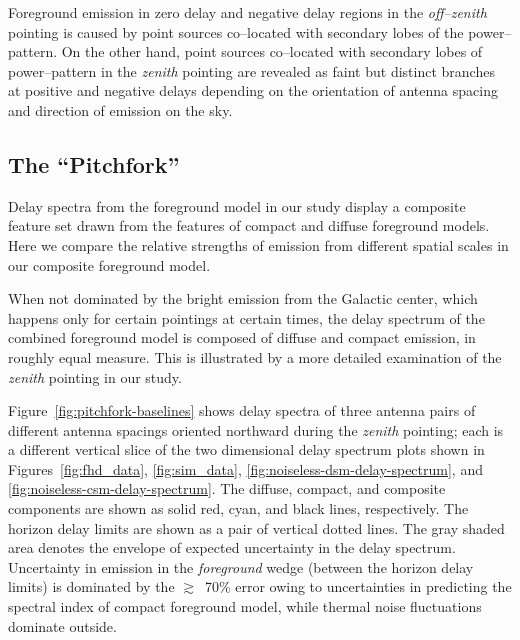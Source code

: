 \documentclass[preprint2,iop,numberedappendix]{emulateapj}
\begin{document}
Foreground emission in zero delay and negative delay regions in the {\it off--zenith} pointing is caused by point sources co--located with secondary lobes of the power--pattern. On the other hand, point sources co--located with secondary lobes of power--pattern in the {\it zenith} pointing are revealed as faint but distinct branches at positive and negative delays depending on the orientation of antenna spacing and direction of emission on the sky. 

\subsection{The ``Pitchfork''}\label{sec:composite}

Delay spectra from the foreground model in our study display a composite feature set drawn from the features of compact and diffuse foreground models. Here we compare the relative strengths of emission from different spatial scales in our composite foreground model. 

When not dominated by the bright emission from the Galactic center, which happens only for certain pointings at certain times, the delay spectrum of the combined foreground model is composed of diffuse and compact emission, in roughly equal measure. This is illustrated by a more detailed examination of the {\it zenith} pointing in our study. 

Figure~\ref{fig:pitchfork-baselines} shows delay spectra of three antenna pairs of different antenna spacings oriented northward during the {\it zenith} pointing; each is a different vertical slice of the two dimensional delay spectrum plots shown in Figures~\ref{fig:fhd_data}, \ref{fig:sim_data}, \ref{fig:noiseless-dsm-delay-spectrum}, and \ref{fig:noiseless-csm-delay-spectrum}. The diffuse, compact, and composite components are shown as solid red, cyan, and black lines, respectively. The horizon delay limits are shown as a pair of vertical dotted lines. The gray shaded area denotes the envelope of expected uncertainty in the delay spectrum. Uncertainty in emission in the {\it foreground} wedge (between the horizon delay limits) is dominated by the $\gtrsim$~70\% error owing to uncertainties in predicting the spectral index of compact foreground model, while thermal noise fluctuations dominate outside. 
\end{document}
